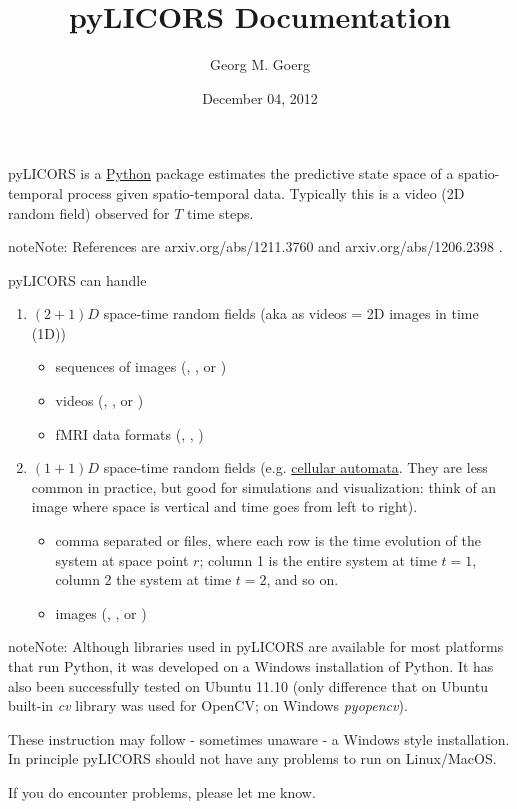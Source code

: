 \documentclass[letterpaper,10pt,english]{sphinxmanual}
\title{pyLICORS Documentation}
\date{December 04, 2012}
\author{Georg M. Goerg}
\begin{document}
\maketitle
\tableofcontents
{}\label{index::doc}


pyLICORS is a \href{http://www.python.org}{Python} package estimates the predictive
state space of a spatio-temporal process given spatio-temporal data.
Typically this is a
video (2D random field) observed for $T$ time steps.

\begin{notice}{note}{Note:}
References are arxiv.org/abs/1211.3760 and arxiv.org/abs/1206.2398 .
\end{notice}

pyLICORS can handle
\begin{enumerate}
\item {} 
$(2+1)D$ space-time random fields (aka as videos = 2D images in time (1D))
\begin{itemize}
\item {} 
sequences of images (, , or )

\item {} 
videos (, , or )

\item {} 
fMRI data formats (, , )

\end{itemize}

\item {} 
$(1+1)D$ space-time random fields
(e.g. \href{https://en.wikipedia.org/wiki/Cellular\_automaton}{cellular automata}. They are less common in practice, but good for simulations
and visualization: think of an image where space is vertical and time goes from left to right).
\begin{itemize}
\item {} 
comma separated  or  files, where each row is the time evolution of the system at space point $r$;
column 1 is the entire system at time $t=1$, column 2 the system at time $t=2$, and so on.

\item {} 
images (, , or )

\end{itemize}

\end{enumerate}

\begin{notice}{note}{Note:}
Although libraries used in pyLICORS are available for most platforms that run Python, it was developed on
a Windows installation of Python. It has also been successfully tested on Ubuntu 11.10 (only difference
that on Ubuntu built-in \emph{cv} library was used for OpenCV; on Windows \emph{pyopencv}).

These instruction may follow - sometimes unaware - a Windows style installation.
In principle pyLICORS should not have any problems to run on Linux/MacOS.

If you do encounter problems, please let me know.
\end{notice}
\end{document}
